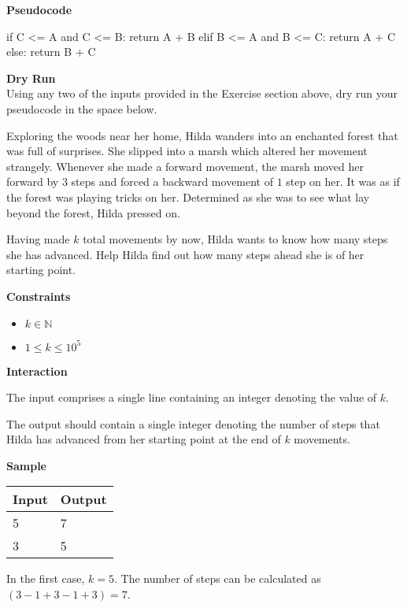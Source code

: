 \documentclass[a4paper]{exam}
\newcommand\heading[1]{\textbf{#1}}
\newcommand\inn{\in \mathbb{N}}
\begin{document}
\begin{questions}
    \heading{Pseudocode}

\begin{python}
if C <= A and C <= B:
    return A + B
elif B <= A and B <= C:
    return A + C
else:
    return B + C
\end{python}


    \heading{Dry Run}\\
    Using any two of the inputs provided in the Exercise section above, dry run your pseudocode in the space below.
    \vspace*{100pt}

    Exploring the woods near her home, Hilda wanders into an enchanted forest that was full of surprises. She slipped into a marsh which altered her movement strangely. Whenever she made a forward movement, the marsh moved her forward by $3$ steps and forced a backward movement of $1$ step on her. It was as if the forest was playing tricks on her. Determined as she was to see what lay beyond the forest, Hilda pressed on.

    Having made $k$ total movements by now, Hilda wants to know how many steps she has advanced. Help Hilda find out how many steps ahead she is of her starting point.

    \heading{Constraints}
    \begin{itemize}
        \item $k \inn$
        \item $1 \le k \le 10^5$
    \end{itemize}

    \heading{Interaction}

    The input comprises a single line containing an integer denoting the value of $k$.

    The output should contain a single integer denoting the number of steps that Hilda has advanced from her starting point at the end of  $k$ movements.

    \heading{Sample}

    \begin{tabularx}{\textwidth}{|X|X|}
        \rowcolor{gray!50}
        \hline
        Input & Output \\ \hline\hline
        5     & 7      \\\hline
        3    & 5     \\\hline
    \end{tabularx}

    In the first case, $k = 5$. The number of steps can be calculated as $(3-1+3-1+3)=7$.
    

\end{questions}
\end{document}
